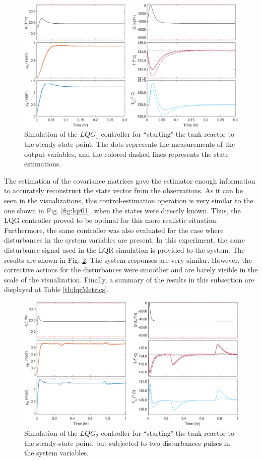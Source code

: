 \documentclass[a4paper,11pt]{book}
\numberwithin{figure}{chapter}
\numberwithin{equation}{chapter}
\numberwithin{table}{chapter}
\theoremstyle{definition}
\begin{document}
\begin{figure}[ht] \centering
	\includegraphics[width=\textwidth]{chapter7/lqg01}
	\caption{Simulation of the $LQG_1$ controller for ``starting" the tank reactor to the steady-state point. The dots represents the measurements of the output variables, and the colored dashed lines represents the state estimations.}
	\label{fig:lqg01Sim}
\end{figure}

The estimation of the covariance matrices gave the estimator enough information to accurately reconstruct the state vector from the observations. As it can be seen in the visualizations, this control-estimation operation is very similar to the one shown in Fig. \ref{fig:lqr01}, when the states were directly known. Thus, the LQG controller proved to be optimal for this more realistic situation. Furthermore, the same controller was also evaluated for the case where disturbances in the system variables are present. In this experiment, the same disturbance signal used in the LQR simulation is provided to the system. The results are shown in Fig. \ref{fig:lqg02Sim}. The system responses are very similar. However, the corrective actions for the disturbances were smoother and are barely visible in the scale of the visualization. Finally, a summary of the results in this subsection are displayed at Table \ref{tb:lqrMetrics}.

\begin{figure}[ht] \centering
	\includegraphics[width=\textwidth]{chapter7/lqg02}
	\caption{Simulation of the $LQG_2$ controller for ``starting" the tank reactor to the steady-state point, but subjected to two disturbances pulses in the system variables.}
	\label{fig:lqg02Sim}
\end{figure}	
\end{document}
